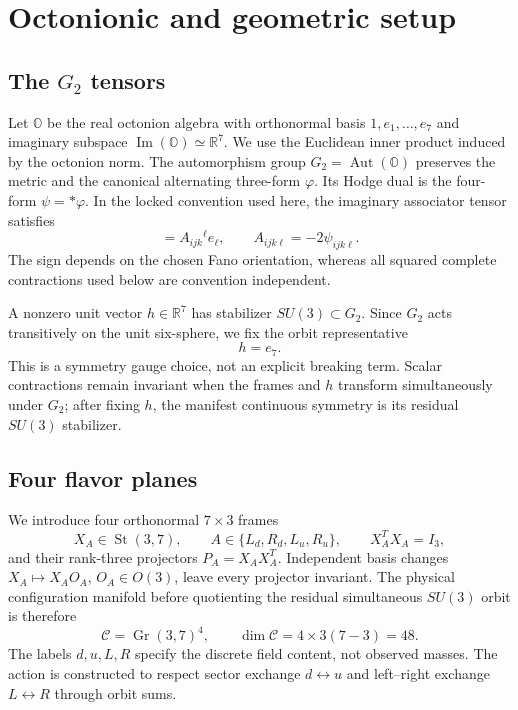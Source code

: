 \documentclass[11pt]{article}
\newcommand{\OO}{\mathbb O}
\newcommand{\RR}{\mathbb R}
\newcommand{\Gr}{\operatorname{Gr}}
\newcommand{\St}{\operatorname{St}}
\begin{document}
\section{Octonionic and geometric setup}

\subsection{The \texorpdfstring{$G_2$}{G2} tensors}

Let $\OO$ be the real octonion algebra with orthonormal basis $1,e_1,\ldots,e_7$ and imaginary subspace $\operatorname{Im}(\OO)\simeq\RR^7$.  We use the Euclidean inner product induced by the octonion norm.  The automorphism group $G_2=\operatorname{Aut}(\OO)$ preserves the metric and the canonical alternating three-form $\varphi$.  Its Hodge dual is the four-form $\psi=*\varphi$.  In the locked convention used here, the imaginary associator tensor satisfies
\begin{equation}
  [e_i,e_j,e_k]=A_{ijk}{}^{\ell}e_\ell,
  \qquad A_{ijk\ell}=-2\psi_{ijk\ell}.
  \label{eq:Atensor}
\end{equation}
The sign depends on the chosen Fano orientation, whereas all squared complete contractions used below are convention independent.

A nonzero unit vector $h\in\RR^7$ has stabilizer $SU(3)\subset G_2$.  Since $G_2$ acts transitively on the unit six-sphere, we fix the orbit representative
\begin{equation}
  h=e_7.
\end{equation}
This is a symmetry gauge choice, not an explicit breaking term.  Scalar contractions remain invariant when the frames and $h$ transform simultaneously under $G_2$; after fixing $h$, the manifest continuous symmetry is its residual $SU(3)$ stabilizer.

\subsection{Four flavor planes}

We introduce four orthonormal $7\times3$ frames
\begin{equation}
  X_A\in\St(3,7),\qquad
  A\in\{L_d,R_d,L_u,R_u\},
  \qquad X_A^T X_A=I_3,
\end{equation}
and their rank-three projectors $P_A=X_AX_A^T$.  Independent basis changes $X_A\mapsto X_AO_A$, $O_A\in O(3)$, leave every projector invariant.  The physical configuration manifold before quotienting the residual simultaneous $SU(3)$ orbit is therefore
\begin{equation}
  \mathcal C=\Gr(3,7)^4,
  \qquad \dim\mathcal C=4\times3(7-3)=48.
  \label{eq:configspace}
\end{equation}
The labels $d,u,L,R$ specify the discrete field content, not observed masses.  The action is constructed to respect sector exchange $d\leftrightarrow u$ and left--right exchange $L\leftrightarrow R$ through orbit sums.
\end{document}
